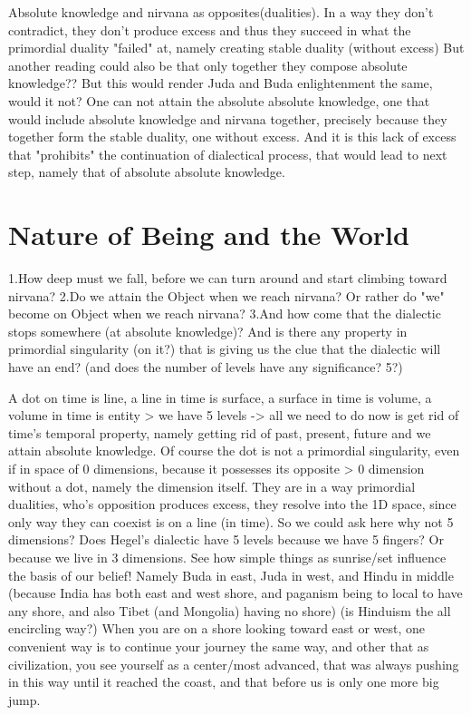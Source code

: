 \documentclass[10pt]{book}
\begin{document}
Absolute knowledge and nirvana as opposites(dualities).
In a way they don't contradict, they don't produce excess and thus they succeed in what the primordial duality "failed" at, namely creating stable duality (without excess) But another reading could also be that only together they compose absolute knowledge?? But this would render Juda and Buda enlightenment the same, would it not?  One can not attain the absolute absolute knowledge, one that would include absolute knowledge and nirvana together, precisely because they together form the stable duality, one without excess. And it is this lack of excess that "prohibits" the continuation of dialectical process, that would lead to next step, namely that of absolute absolute knowledge.

\chapter {Nature of Being and the World}

1.How deep must we fall, before we can turn around and start climbing toward nirvana?
2.Do we attain the Object when we reach nirvana? Or rather do "we" become on Object when we reach nirvana?
3.And how come that the dialectic stops somewhere (at absolute knowledge)? And is there any property in primordial singularity (on it?) that is giving us the clue that the dialectic will have an end? (and does the number of levels have any significance? 5?)

A dot on time is line, a line in time is surface, a surface in time is volume, a volume in time is entity > we have 5 levels -> all we need to do now is get rid of time's temporal property, namely getting rid of past, present, future and we attain absolute knowledge.
Of course the dot is not a primordial singularity, even if in space of 0 dimensions, because it possesses its opposite > 0 dimension without a dot, namely the dimension itself. They are in a way primordial dualities, who's opposition produces excess, they resolve into the 1D space, since only way they can coexist is on a line (in time).
So we could ask here why not 5 dimensions? Does Hegel's dialectic have 5 levels because we have 5 fingers? Or because we live in 3 dimensions.
See how simple things as sunrise/set influence the basis of our belief! Namely Buda in east, Juda in west, and Hindu in middle (because India has both east and west shore, and paganism being to local to have any shore, and also Tibet (and Mongolia) having no shore) (is Hinduism the all encircling way?) When you are on a shore looking toward east or west, one convenient way is to continue your journey the same way, and other that as civilization, you see yourself as a center/most advanced, that was always pushing in this way until it reached the coast, and that before us is only one more big jump. 
\end{document}
